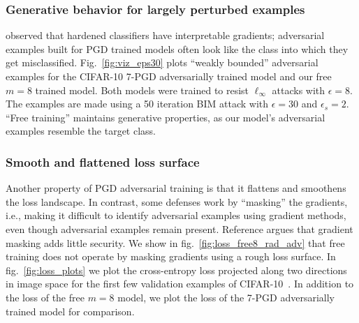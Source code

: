 \documentclass{article}
\begin{document}
\subsubsection*{Generative behavior for largely perturbed examples}
\cite{tsipras2018robustness} observed that hardened classifiers have interpretable gradients; adversarial examples built for PGD trained models often look like the class into which they get misclassified.
Fig.~\ref{fig:viz_eps30} plots ``weakly bounded'' adversarial examples for the CIFAR-10 7-PGD adversarially trained model \citep{madry2017towards} and our free $m=8$ trained model. Both models were trained to resist $\ell_\infty$ attacks with $\epsilon=8$. The examples are made using a 50 iteration BIM attack with $\epsilon=30$ and $\epsilon_s=2$.  ``Free training'' maintains generative properties, as our model's adversarial examples resemble the target class.



\subsubsection*{Smooth and flattened loss surface}
Another property of PGD adversarial training is that it flattens and smoothens the loss landscape. In contrast, some defenses work by ``masking'' the gradients, i.e., making it difficult to identify adversarial examples using gradient methods, even though adversarial examples remain present.
Reference \cite{engstrom2018evaluating} argues that gradient masking adds little security. We show in fig.~\ref{fig:loss_free8_rad_adv} that free training does not operate by masking gradients using a rough loss surface.  
In fig.~\ref{fig:loss_plots} we plot the cross-entropy loss projected along two directions in image space for the first few validation examples of CIFAR-10~\citep{li2018visualizing}. In addition to the loss of the free $m=8$ model, we plot the loss of the 7-PGD adversarially trained model for comparison.
\end{document}
